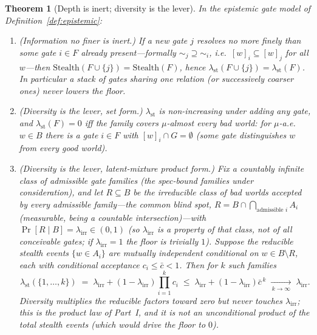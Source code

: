 \documentclass[11pt]{article}
\newtheorem{theorem}{Theorem}
\theoremstyle{definition}
\theoremstyle{remark}
\newcommand{\lst}{\lambda_{\mathrm{st}}}
\newcommand{\lirr}{\lambda_{\mathrm{irr}}}
\newcommand{\Stealth}{\mathrm{Stealth}}
\begin{document}
\begin{theorem}[Depth is inert; diversity is the lever]\label{thm:epistemic}
In the epistemic gate model of Definition~\ref{def:epistemic}:
\begin{enumerate}[leftmargin=1.6em,itemsep=2pt]
\item\label{it:depth} \emph{(Information no finer is inert.)} If a new gate $j$ resolves no more
finely than some gate $i\in F$ already present---formally $\sim_j\supseteq\sim_i$, i.e.\
$[w]_i\subseteq[w]_j$ for all $w$---then $\Stealth(F\cup\{j\})=\Stealth(F)$, hence
$\lst(F\cup\{j\})=\lst(F)$. In particular a stack of gates sharing one relation (or successively
coarser ones) never lowers the floor.
\item\label{it:covers} \emph{(Diversity is the lever, set form.)} $\lst$ is non-increasing under
adding any gate, and $\lst(F)=0$ iff the family \emph{covers} $\mu$-almost every bad world: for
$\mu$-a.e.\ $w\in B$ there is a gate $i\in F$ with $[w]_i\cap G=\emptyset$ (some gate distinguishes $w$
from every good world).
\item\label{it:product} \emph{(Diversity is the lever, latent-mixture product form.)} Fix a countably
infinite class of \emph{admissible} gate families (the spec-bound families under consideration), and let
$R\subseteq B$ be the \emph{irreducible} class of bad worlds accepted by every admissible family---the
common blind spot, $R=B\cap\bigcap_{\text{admissible }i}A_i$ (measurable, being a countable
intersection)---with $\Pr[R\mid B]=\lirr\in(0,1)$ (so $\lirr$ is a property of that class, not of all
conceivable gates; if $\lirr=1$ the floor is trivially $1$). Suppose the reducible stealth events $\{w\in A_i\}$ are mutually
independent conditional on $w\in B\setminus R$, each with conditional acceptance $c_i\le\bar c<1$. Then
for $k$ such families
\[
\lst(\{1,\dots,k\})\;=\;\lirr+(1-\lirr)\prod_{i=1}^{k}c_i\;\le\;\lirr+(1-\lirr)\bar c^{\,k}
\;\xrightarrow[\,k\to\infty\,]{}\;\lirr .
\]
Diversity multiplies the \emph{reducible} factors toward zero but never touches $\lirr$; this is the
product law of Part~I, and it is \emph{not} an unconditional product of the total stealth events (which
would drive the floor to $0$).
\end{enumerate}
\end{theorem}
\end{document}

